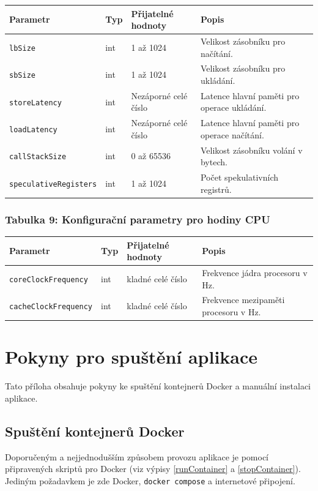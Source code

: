 \begin{tabular}{|l|l|l|p{5.9cm}|}
\hline
Parametr & Typ & Přijatelné hodnoty & Popis \\
\hline
\texttt{lbSize} & int & 1 až 1024 & Velikost zásobníku pro načítání. \\
\texttt{sbSize} & int & 1 až 1024 & Velikost zásobníku pro ukládání. \\
\texttt{storeLatency} & int & Nezáporné celé číslo & Latence hlavní paměti pro operace ukládání. \\
\texttt{loadLatency} & int & Nezáporné celé číslo & Latence hlavní paměti pro operace načítání. \\
\texttt{callStackSize} & int & 0 až 65536 & Velikost zásobníku volání v bytech. \\
\texttt{speculativeRegisters} & int & 1 až 1024 & Počet spekulativních registrů. \\
\hline
\end{tabular}

\subsection*{Tabulka 9: Konfigurační parametry pro hodiny CPU}

\begin{tabular}{|l|l|l|p{6.4cm}|}
\hline
Parametr & Typ & Přijatelné hodnoty & Popis \\
\hline
\texttt{coreClockFrequency} & int & kladné celé číslo & Frekvence jádra procesoru v Hz. \\
\texttt{cacheClockFrequency} & int & kladné celé číslo & Frekvence mezipaměti procesoru v Hz. \\
\hline
\end{tabular}

\chapter{Pokyny pro spuštění aplikace}
\label{installSteps}

Tato příloha obsahuje pokyny ke spuštění kontejnerů Docker a manuální instalaci aplikace.

\section{Spuštění kontejnerů Docker}

Doporučeným a nejjednodušším způsobem provozu aplikace je pomocí připravených skriptů pro Docker (viz výpisy \ref{runContainer} a \ref{stopContainer}).
Jediným požadavkem je zde Docker, \texttt{docker compose} a internetové připojení.


